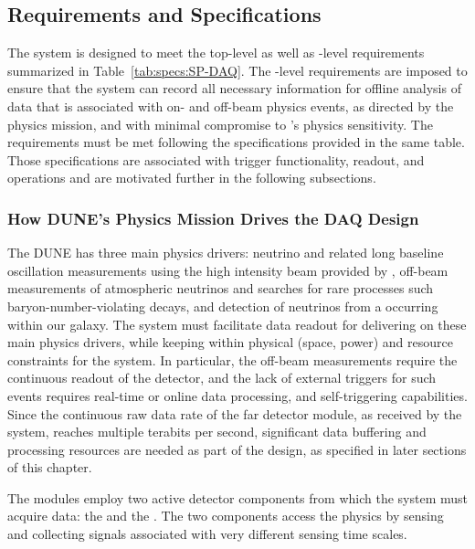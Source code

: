 \subsection{Requirements and Specifications}
\label{sec:fd-daq:requirements}

The    system is designed to meet the
 top-level as well as -level requirements
summarized in Table~\ref{tab:specs:SP-DAQ}. The -level requirements are
imposed to ensure that the 
system %
can record all necessary information for offline 
analysis of data that is associated with on- and off-beam physics events, as directed
by the  physics mission, and with minimal compromise to
's physics sensitivity. The requirements must be met following the 
specifications provided in the same table.
Those specifications are
associated with trigger functionality, readout,
and operations and are motivated further in the following subsections.

\subsubsection{How DUNE's Physics Mission Drives the DAQ Design}

The DUNE  has three main physics drivers: neutrino  and related
long baseline oscillation measurements using the high intensity beam provided
by \fnal, off-beam measurements of atmospheric neutrinos and searches
for rare processes such baryon-number-violating decays,
and detection of neutrinos from a  occurring within our galaxy. The
   system must facilitate data
readout for delivering on these main physics drivers, while keeping
within physical (space, power) and resource constraints for
the system. In particular, the off-beam measurements require the
continuous readout of the detector, and the lack of external triggers for such
events requires real-time or online data processing, and
self-triggering capabilities. Since the
continuous raw data rate of the far detector module, as received by
the  system, reaches multiple
terabits per second, significant data buffering and processing
resources are needed as part of the design, as specified in
later sections of this chapter.

The   modules employ two active detector components from which the  system must acquire data: the  and the . The two components access the physics by sensing and collecting signals associated with very different sensing time scales.

